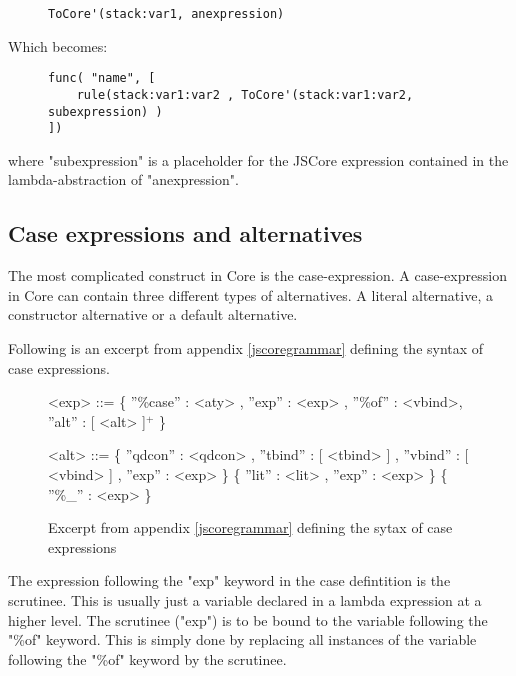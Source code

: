 \begin{figure}[H]
\lstset{ %
language=Haskell,
caption=Lambda abstraction in Core' format,
label=lst:int1
}
\begin{lstlisting}
ToCore'(stack:var1, anexpression)
\end{lstlisting}
\end{figure}

Which becomes:

\begin{figure}[H]
\lstset{ %
language=Haskell,
caption=Lambda abstraction in Core' format,
label=lst:int1
}
\begin{lstlisting}
func( "name", [
    rule(stack:var1:var2 , ToCore'(stack:var1:var2, subexpression) )
])
\end{lstlisting}
\end{figure}

where "subexpression" is a placeholder for the JSCore expression contained in the 
lambda-abstraction of "anexpression".


\subsection{Case expressions and alternatives}

The most complicated construct in Core is the case-expression. A case-expression
in Core can contain three different types of alternatives. A literal alternative,
a constructor alternative or a default alternative. 

Following is an excerpt from appendix \ref{jscoregrammar} defining the syntax 
of case expressions.

\begin{figure}[H]
\scriptsize
\begin{grammar}

<exp>		  ::= 	 \{ ''\%case'' : <aty> , ''exp'' : <exp> , ''\%of'' : <vbind>, ''alt'' : [ <alt> ]$^{+}$ \}	

<alt>		  ::= 	 \{ ''qdcon'' : <qdcon> , ''tbind'' : [ <tbind> ] , ''vbind'' : [ <vbind> ] , ''exp'' : <exp> \}
		  \alt 			 \{ ''lit'' : <lit> , ''exp'' : <exp> \}
		  \alt 			 \{ ''\%\_'' : <exp> \}	
\end{grammar}

\label{caseexpr}
\caption{Excerpt from appendix \ref{jscoregrammar} defining the sytax of case expressions}
\end{figure}

The expression following the "exp" keyword in the case defintition is the scrutinee. This
is usually just a variable declared in a lambda expression at a higher level.
The scrutinee ("exp") is to be bound to the variable following the "\%of" keyword.
This is simply done by replacing all instances of the variable following the "\%of" keyword
by the scrutinee.

